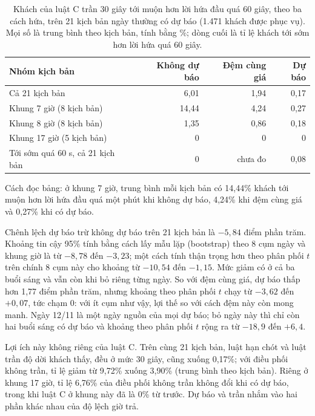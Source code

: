 \begin{table}[htbp]
\centering
\caption{Khách của luật C trần 30 giây tới muộn hơn lời hứa đầu quá 60 giây, theo ba cách hứa, trên 21 kịch bản
ngày thường có dự báo (1.471 khách được phục vụ). Mọi số là trung bình theo kịch bản, tính bằng \%; dòng cuối là
tỉ lệ khách tới sớm hơn lời hứa quá 60 giây.}
\label{bang:c4-dubao}
\small
\begin{tabular}{@{}lrrr@{}}
\toprule
\textbf{Nhóm kịch bản} & \textbf{Không dự báo} & \textbf{Đệm cùng giá} & \textbf{Dự báo}\\
\midrule
Cả 21 kịch bản & 6,01 & 1,94 & 0,17\\
Khung 7 giờ (8 kịch bản) & 14,44 & 4,24 & 0,27\\
Khung 8 giờ (8 kịch bản) & 1,35 & 0,86 & 0,18\\
Khung 17 giờ (5 kịch bản) & 0 & 0 & 0\\
\midrule
Tới sớm quá 60 s, cả 21 kịch bản & 0 & chưa đo & 0,08\\
\bottomrule
\end{tabular}
\end{table}

Cách đọc bảng: ở khung 7 giờ, trung bình mỗi kịch bản có 14,44\% khách tới muộn hơn lời hứa đầu quá một phút
khi không dự báo, 4,24\% khi đệm cùng giá và 0,27\% khi có dự báo.

Chênh lệch dự báo trừ không dự báo trên 21 kịch bản là $-5{,}84$ điểm phần trăm. Khoảng tin cậy 95\% tính bằng
cách lấy mẫu lặp (bootstrap) theo 8 cụm ngày và khung giờ là từ $-8{,}78$ đến $-3{,}23$; một cách tính thận trọng
hơn theo phân phối $t$ trên chính 8 cụm này cho khoảng từ $-10{,}54$ đến $-1{,}15$. Mức giảm có ở cả ba buổi sáng
và vẫn còn khi bỏ riêng từng ngày. So với đệm cùng giá, dự báo thấp hơn 1,77 điểm phần trăm, nhưng khoảng theo
phân phối $t$ chạy từ $-3{,}62$ đến $+0{,}07$, tức chạm 0: với ít cụm như vậy, lợi thế so với cách đệm này còn
mong manh. Ngày 12/11 là một ngày nguồn của mọi dự báo; bỏ ngày này thì chỉ còn hai buổi sáng có dự báo và khoảng
theo phân phối $t$ rộng ra từ $-18{,}9$ đến $+6{,}4$.

Lợi ích này không riêng của luật C. Trên cùng 21 kịch bản, luật hạn chót và luật trần độ dời khách thấy, đều ở
mức 30 giây, cũng xuống 0,17\%; với điều phối không trần, tỉ lệ giảm từ 9,72\% xuống 3,90\% (trung bình theo kịch
bản). Riêng ở khung 17 giờ, tỉ lệ 6,76\% của điều phối không trần không đổi khi có dự báo, trong khi luật C ở khung
này đã là 0\% từ trước. Dự báo và trần nhắm vào hai phần khác nhau của độ lệch giờ trả.

